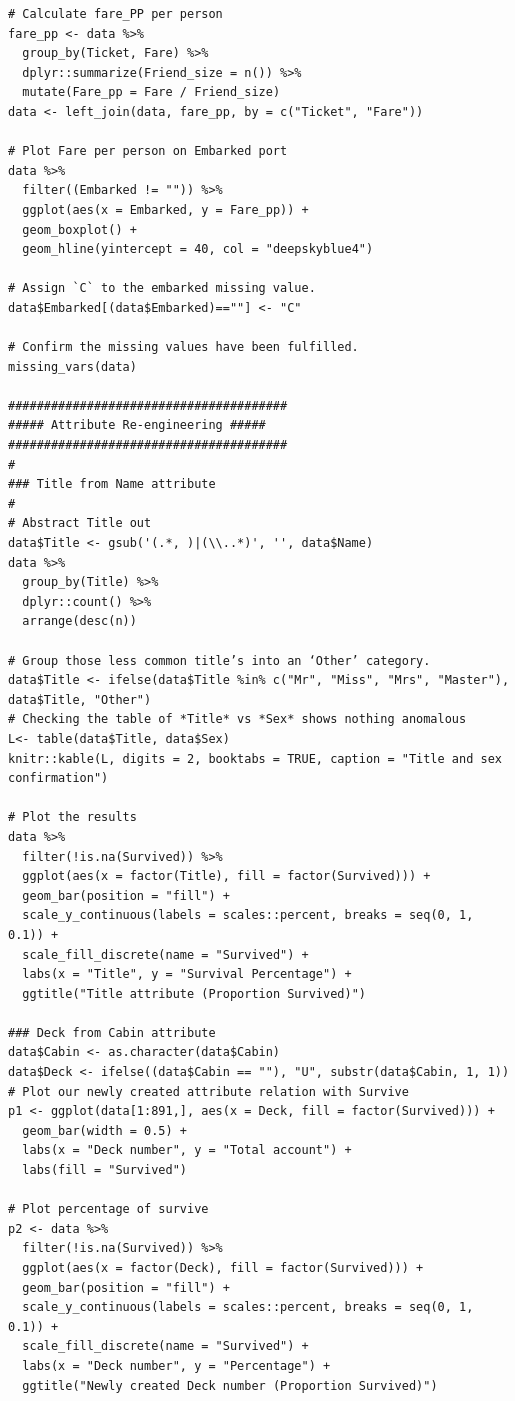 \documentclass[
]{book}
\begin{document}
\begin{verbatim}
# Calculate fare_PP per person
fare_pp <- data %>%
  group_by(Ticket, Fare) %>%
  dplyr::summarize(Friend_size = n()) %>%
  mutate(Fare_pp = Fare / Friend_size)
data <- left_join(data, fare_pp, by = c("Ticket", "Fare"))

# Plot Fare per person on Embarked port
data %>%
  filter((Embarked != "")) %>%
  ggplot(aes(x = Embarked, y = Fare_pp)) +
  geom_boxplot() +
  geom_hline(yintercept = 40, col = "deepskyblue4")

# Assign `C` to the embarked missing value.
data$Embarked[(data$Embarked)==""] <- "C"

# Confirm the missing values have been fulfilled.
missing_vars(data)

#######################################
##### Attribute Re-engineering #####
#######################################
#
### Title from Name attribute
#
# Abstract Title out
data$Title <- gsub('(.*, )|(\\..*)', '', data$Name)
data %>%
  group_by(Title) %>%
  dplyr::count() %>%
  arrange(desc(n))

# Group those less common title’s into an ‘Other’ category.
data$Title <- ifelse(data$Title %in% c("Mr", "Miss", "Mrs", "Master"), data$Title, "Other")
# Checking the table of *Title* vs *Sex* shows nothing anomalous
L<- table(data$Title, data$Sex)
knitr::kable(L, digits = 2, booktabs = TRUE, caption = "Title and sex confirmation")

# Plot the results
data %>%
  filter(!is.na(Survived)) %>%
  ggplot(aes(x = factor(Title), fill = factor(Survived))) +
  geom_bar(position = "fill") +
  scale_y_continuous(labels = scales::percent, breaks = seq(0, 1, 0.1)) +
  scale_fill_discrete(name = "Survived") +
  labs(x = "Title", y = "Survival Percentage") +
  ggtitle("Title attribute (Proportion Survived)")

### Deck from Cabin attribute
data$Cabin <- as.character(data$Cabin)
data$Deck <- ifelse((data$Cabin == ""), "U", substr(data$Cabin, 1, 1))
# Plot our newly created attribute relation with Survive
p1 <- ggplot(data[1:891,], aes(x = Deck, fill = factor(Survived))) +
  geom_bar(width = 0.5) +
  labs(x = "Deck number", y = "Total account") +
  labs(fill = "Survived")

# Plot percentage of survive
p2 <- data %>%
  filter(!is.na(Survived)) %>%
  ggplot(aes(x = factor(Deck), fill = factor(Survived))) +
  geom_bar(position = "fill") +
  scale_y_continuous(labels = scales::percent, breaks = seq(0, 1, 0.1)) +
  scale_fill_discrete(name = "Survived") +
  labs(x = "Deck number", y = "Percentage") +
  ggtitle("Newly created Deck number (Proportion Survived)")


\end{verbatim}
\end{document}
